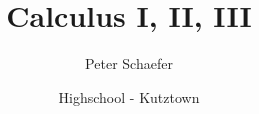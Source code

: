

  
\title{Calculus I, II, III}
\author{Peter Schaefer}
\date{Highschool - Kutztown}



\maketitle
\tableofcontents
\newpage









